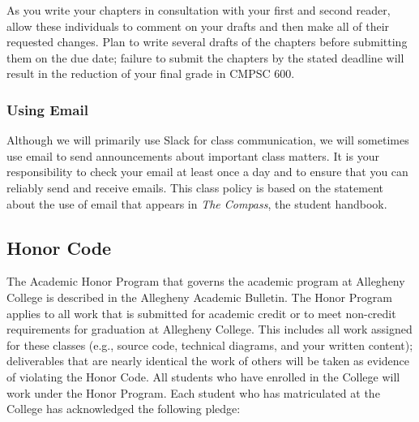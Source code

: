 As you write your chapters in consultation with your first and second reader, allow these individuals to comment on your
drafts and then make all of their requested changes.  Plan to write several drafts of the chapters before submitting them
on the due date; failure to submit the chapters by the stated deadline will result in the reduction of your final grade
in CMPSC 600.



\vspace*{-.15in}
\subsubsection*{Using Email}
\vspace*{-.05in}

Although we will primarily use Slack for class communication, we will sometimes use email to send announcements about
important class matters. It is your responsibility to check your email at least once a day and to ensure that you can
reliably send and receive emails. This class policy is based on the statement about the use of email that appears in
{\em The Compass}, the student handbook.

\vspace*{-.15in}
\subsection*{Honor Code}
\vspace*{-.05in}

The Academic Honor Program that governs the academic program at Allegheny College is described in the Allegheny
Academic Bulletin.  The Honor Program applies to all work that is submitted for academic credit or to meet non-credit
requirements for graduation at Allegheny College.  This includes all work assigned for these classes (e.g., source code,
technical diagrams, and your written content); deliverables that are nearly identical the work of others will be taken
as evidence of violating the Honor Code. All students who have enrolled in the College will work under the Honor
Program.  Each student who has matriculated at the College has acknowledged the following pledge:


